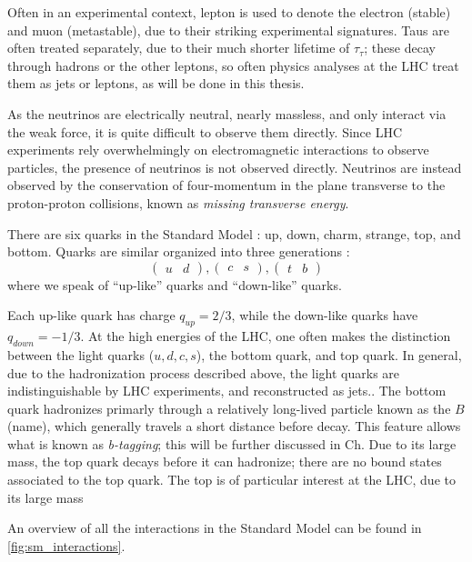 Often in an experimental context, lepton is used to denote the electron (stable) and muon (metastable), due to their striking experimental signatures.
Taus are often treated separately, due to their much shorter lifetime of $\tau_{\tau}  $; these decay through hadrons or the other leptons, so often physics analyses at the LHC treat them as jets or leptons, as will be done in this thesis.

As the neutrinos are electrically neutral, nearly massless, and only interact via the weak force, it is quite difficult to observe them directly.
Since LHC experiments rely overwhelmingly on electromagnetic interactions to observe particles, the presence of neutrinos is not observed directly.
Neutrinos are instead observed by the conservation of four-momentum in the plane transverse to the proton-proton collisions, known as \textit{missing transverse energy}.

There are six quarks in the Standard Model : up, down, charm, strange, top, and bottom. Quarks are similar organized into three generations :
\begin{equation}
\begin{pmatrix} u & d \end{pmatrix} , \begin{pmatrix} c & s \end{pmatrix}, \begin{pmatrix} t & b \end{pmatrix}
\end{equation}
where we speak of ``up-like'' quarks and ``down-like'' quarks.

Each up-like quark has charge $q_{up} = 2/3$, while the down-like quarks have $q_{down} = -1/3$.
At the high energies of the LHC, one often makes the distinction between the light quarks ($u,d,c,s$), the bottom quark, and top quark.
In general, due to the hadronization process described above, the light quarks are indistinguishable by LHC experiments, and reconstructed as jets..
The bottom quark hadronizes primarly through a relatively long-lived particle known as the $ B$ (name), which generally travels a short distance before decay.
This feature allows what is known as \textit{b-tagging}; this will be further discussed in Ch.
Due to its large mass, the top quark decays before it can hadronize; there are no bound states associated to the top quark.
The top is of particular interest at the LHC, due to its large mass

An overview of all the interactions in the Standard Model can be found in \ref{fig:sm_interactions}.


